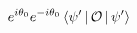 \documentclass[preview]{standalone}
\begin{document}
\begin{align*}
e^{i \theta_0}e^{-i \theta_0}\Braket{\psi ' |\mathcal{O}|\psi '}
\end{align*}
\end{document}
